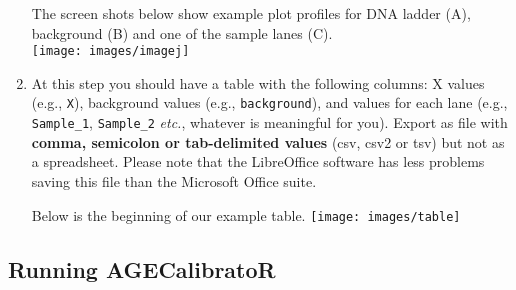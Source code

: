 \documentclass[11pt]{article}
\begin{document}
\begin{enumerate}
\bigskip 

The screen shots below show example plot profiles for DNA ladder (A), background (B) and one of the sample lanes (C). \\ 

\bigskip 
\texttt{[image: images/imagej]}


\item At this step you should have a table with the following columns: X values (e.g., \texttt{X}), background values (e.g., \texttt{background}), and values for each lane (e.g., \texttt{Sample\_1}, \texttt{Sample\_2} \textit{etc.}, whatever is meaningful for you). Export as file with \textbf{comma, semicolon or tab-delimited values} (csv, csv2 or tsv) but not as a spreadsheet. 
Please note that the LibreOffice software has less problems saving this file than the Microsoft Office suite.


Below is the beginning of our example table. 
\bigskip \newline
\texttt{[image: images/table]} 

\end{enumerate}


\newpage

\subsection*{Running AGECalibratoR}
\end{document}

